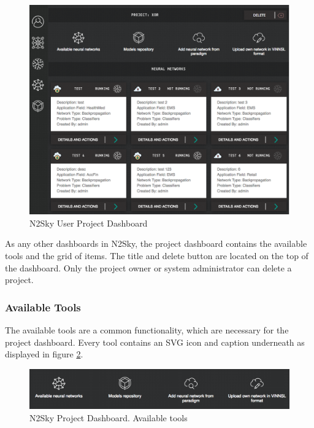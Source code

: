 \begin{figure}[H]
\begin{center}
  \includegraphics[width=\linewidth]{components/5/img/projects_dsahboard.png}
  \caption{N2Sky User Project Dashboard}
  \label{fig:projects_dsahboard}
\end{center}
\end{figure}

As any other dashboards in N2Sky, the project dashboard contains the available tools and the grid of items. The title and delete button are located on the top of the dashboard. Only the project owner or system administrator can delete a project. 

\subsubsection{Available Tools} 

The available tools are a common functionality, which are necessary for the project dashboard. Every tool contains an SVG icon and caption underneath as displayed in figure \ref{fig:projecttools}. 

\begin{figure}[htbp]
\begin{center}
  \includegraphics[width=\linewidth]{components/5/img/project_tools.png}
  \caption{N2Sky Project Dashboard. Available tools}
  \label{fig:projecttools}
\end{center}
\end{figure}

